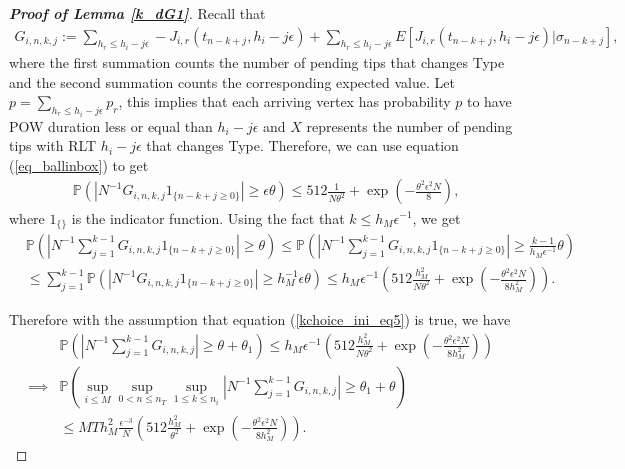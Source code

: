 \documentclass[12pt]{article}
\def\P{\mathbb{P}}
\numberwithin{equation}{section}  %
\begin{document}
\begin{proof}[\textbf{Proof of Lemma \ref{k_dG1}}]
Recall that
\begin{align*}
 G_{i,n,k,j}:=\sum_{h_r\leq h_i-j\epsilon}-J_{i,r}(t_{n-k+j},h_i-j\epsilon)
+\sum_{h_r\leq h_i-j\epsilon}E[J_{i,r}(t_{n-k+j},h_i-j\epsilon)|\sigma_{n-k+j}]
,
\end{align*}
where the first summation counts the number of pending tips that changes Type and the second summation counts the corresponding expected value. Let $p=\sum_{h_r\leq h_i-j\epsilon}p_r$, this implies that each arriving vertex has probability $p$ to have POW duration less or equal than $h_i-j\epsilon$ and $X$ represents the number of pending tips with RLT $h_i-j\epsilon$ that changes Type. Therefore, we can use equation (\ref{eq_ballinbox}) to get
\begin{align*} 
&\P(\left|N^{-1}G_{i,n,k,j}1_{\{n-k+j\geq 0\}}\right|\geq \epsilon\theta)\leq 512\frac{1}{N\theta^2}+\exp\left(
-\frac{\theta^2 \epsilon^2 N}{8}\right),
\end{align*} 
where $1_{\{\}}$ is the indicator function. Using the fact that $k\leq h_M\epsilon^{-1}$, we  get
{\small
\begin{align*} 
&\P\left(\left|N^{-1}\sum_{j=1}^{k-1} G_{i,n,k,j}1_{\{n-k+j\geq 0\}}\right|\geq\theta\right)\leq\P\left(\left|N^{-1}\sum_{j=1}^{k-1} G_{i,n,k,j}1_{\{n-k+j\geq 0\}}\right|\geq\frac{k-1}{h_M\epsilon^{-1}}\theta\right)\\
&\leq \sum_{j=1}^{k-1} \P(\left|N^{-1}G_{i,n,k,j}1_{\{n-k+j\geq 0\}}\right|\geq h_M^{-1}\epsilon\theta)\leq h_M\epsilon^{-1}\left(512\frac{h_M^2}{N\theta^2}+\exp\left(
-\frac{\theta^2 \epsilon^2 N}{8h^2_M}\right)
\right).
\end{align*}}

Therefore with the assumption that equation (\ref{kchoice_ini_eq5}) is true, we have
\begin{align*}
&\P\left(\left|N^{-1}\sum_{j=1}^{k-1} G_{i,n,k,j}\right|\geq\theta+\theta_1\right)\leq h_M\epsilon^{-1}\left(512\frac{h_M^2}{N\theta^2}+\exp\left(
-\frac{\theta^2 \epsilon^2 N}{8h^2_M}\right)
\right)\\
\implies&\P\left(\sup_{i\leq M}\sup_{0<n\leq n_T}\sup_{1\leq k\leq n_i}\left|
  N^{-1} \sum_{j=1}^{k-1}  G_{i,n,k,j}
\right|\geq \theta_1+\theta
\right)\\
&\leq M T h_M^2 \frac{\epsilon^{-3}}{N}
\left(
512\frac{h_M^2}{\theta^2}+\exp\left(
-\frac{\theta^2 \epsilon^2 N}{8h^2_M}\right)
\right).
\end{align*} 
\end{proof}
\end{document}
